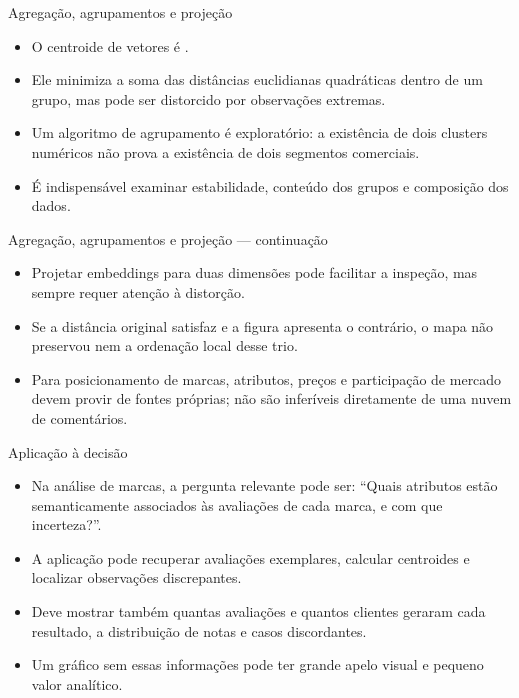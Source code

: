 \documentclass[10pt,aspectratio=169]{beamer}
\begin{document}
\begin{frame}[t]{Agregação, agrupamentos e projeção}
\small
\begin{itemize}
\item O centroide de vetores é .
\item Ele minimiza a soma das distâncias euclidianas quadráticas dentro de um grupo, mas pode ser distorcido por observações extremas.
\item Um algoritmo de agrupamento é exploratório: a existência de dois clusters numéricos não prova a existência de dois segmentos comerciais.
\item É indispensável examinar estabilidade, conteúdo dos grupos e composição dos dados.
\end{itemize}
\end{frame}

\begin{frame}[t]{Agregação, agrupamentos e projeção — continuação}
\small
\begin{itemize}
\item Projetar embeddings para duas dimensões pode facilitar a inspeção, mas sempre requer atenção à distorção.
\item Se a distância original satisfaz e a figura apresenta o contrário, o mapa não preservou nem a ordenação local desse trio.
\item Para posicionamento de marcas, atributos, preços e participação de mercado devem provir de fontes próprias; não são inferíveis diretamente de uma nuvem de comentários.
\end{itemize}
\end{frame}

\begin{frame}[t]{Aplicação à decisão}
\small
\begin{itemize}
\item Na análise de marcas, a pergunta relevante pode ser: ``Quais atributos estão semanticamente associados às avaliações de cada marca, e com que incerteza?''.
\item A aplicação pode recuperar avaliações exemplares, calcular centroides e localizar observações discrepantes.
\item Deve mostrar também quantas avaliações e quantos clientes geraram cada resultado, a distribuição de notas e casos discordantes.
\item Um gráfico sem essas informações pode ter grande apelo visual e pequeno valor analítico.
\end{itemize}
\end{frame}
\end{document}

